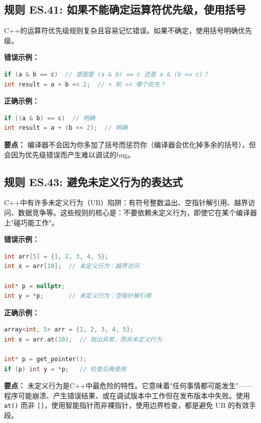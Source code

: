 \subsection*{\textbf{规则 ES.41:} 如果不能确定运算符优先级，使用括号}

C++的运算符优先级规则复杂且容易记忆错误。如果不确定，使用括号明确优先级。

\textbf{错误示例：}

\begin{lstlisting}[language=C++]
if (a & b == c)  // 意图是 (a & b) == c 还是 a & (b == c)？
int result = a + b << 2;  // + 和 << 哪个优先？
\end{lstlisting}

\textbf{正确示例：}

\begin{lstlisting}[language=C++]
if ((a & b) == c)  // 明确
int result = a + (b << 2);  // 明确
\end{lstlisting}

\textbf{要点：} 编译器不会因为你多加了括号而惩罚你（编译器会优化掉多余的括号），但会因为优先级错误而产生难以调试的bug。

\subsection*{\textbf{规则 ES.43:} 避免未定义行为的表达式}

C++中有许多未定义行为（UB）陷阱：有符号整数溢出、空指针解引用、越界访问、数据竞争等。这些规则的核心是：不要依赖未定义行为，即使它在某个编译器上"碰巧能工作"。

\textbf{错误示例：}

\begin{lstlisting}[language=C++]
int arr[5] = {1, 2, 3, 4, 5};
int x = arr[10];  // 未定义行为：越界访问

int* p = nullptr;
int y = *p;       // 未定义行为：空指针解引用
\end{lstlisting}

\textbf{正确示例：}

\begin{lstlisting}[language=C++]
array<int, 5> arr = {1, 2, 3, 4, 5};
int x = arr.at(10);  // 抛出异常，而非未定义行为

int* p = get_pointer();
if (p) int y = *p;   // 检查后再使用
\end{lstlisting}

\textbf{要点：} 未定义行为是C++中最危险的特性。它意味着"任何事情都可能发生"——程序可能崩溃、产生错误结果、或在调试版本中工作但在发布版本中失败。使用 \texttt{at()} 而非 \texttt{[]}，使用智能指针而非裸指针，使用边界检查，都是避免 UB 的有效手段。

